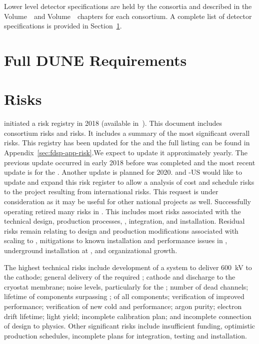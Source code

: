 Lower level detector specifications are held by the consortia and
described in the   
Volume~\volnumbersp\ and  Volume~\volnumberdp\ chapters for
each consortium. A complete list of detector specifications is
provided in Section~\ref{sec:fdsp-app-requirements}.

\section{Full DUNE Requirements}
\label{sec:fdsp-app-requirements}



\section{Risks}
\label{sec:fdsp-coord-risks}

 initiated a risk registry in 2018 (available
in~). This document includes consortium risks and
 risks. It includes a summary of the most significant
overall  risks.  This registry has been updated for the
 and the full listing can be found in
Appendix~\ref{sec:fdsp-app-risk}.We  expect to update it
approximately yearly. The previous update occurred in early 2018
before  was completed and the most recent update is for the
. Another update is planned for 2020. %
 and
-US would like  to update and expand this risk
register to allow a  analysis of cost and schedule risks to
the  project resulting from international 
risks. This request is under consideration as it may be useful for
other national projects as well.  Successfully operating
 retired many  risks in
. This includes most risks associated with the technical
design, production processes, , integration, and
installation. Residual risks remain relating to design and production
modifications associated with scaling to , mitigations to
known installation and performance issues in ,
underground installation at , and organizational growth.

The highest technical risks include development of a system to
deliver \SI{600}{kV} to the  cathode; general delivery of the
required ; cathode and  discharge to the cryostat
membrane; noise levels, particularly for the ; 
number of dead channels; lifetime of components surpassing \dunelifetime{}; 
 of all components; verification of improved 
performance; verification of new cold   and   performance;
argon purity; electron drift lifetime; \phel light yield;
incomplete calibration plan; and incomplete connection of design to
physics. Other significant risks include insufficient funding, optimistic
production schedules, incomplete plans for integration, testing and installation. 

